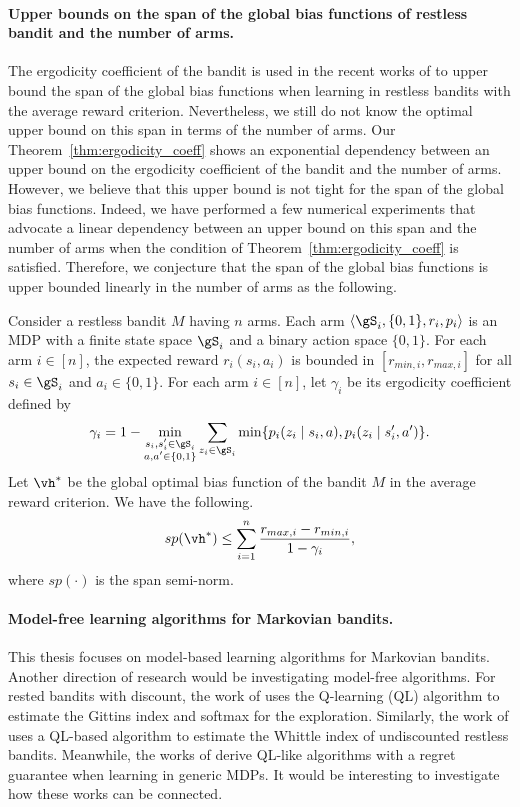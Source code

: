 \paragraph{Upper bounds on the span of the global bias functions of restless bandit and the number of arms.}
The ergodicity coefficient of the bandit is used in the recent works of \cite{akbarzadeh2022learning} to upper bound the span of the global bias functions when learning in restless bandits with the average reward criterion.
Nevertheless, we still do not know the optimal upper bound on this span in terms of the number of arms. 
Our Theorem~\ref{thm:ergodicity_coeff} shows an exponential dependency between an upper bound on the ergodicity coefficient of the bandit and the number of arms.
However, we believe that this upper bound is not tight for the span of the global bias functions.
Indeed, we have performed a few numerical experiments that advocate a linear dependency between an upper bound on this span and the number of arms when the condition of Theorem~\ref{thm:ergodicity_coeff} is satisfied.
Therefore, we conjecture that the span of the global bias functions is upper bounded linearly in the number of arms as the following.
\begin{conj}
    \label{conj:span}
    Consider a restless bandit $M$ having $n$ arms.
    Each arm $\langle\gS_i,\{0,1\},r_i,p_i\rangle$ is an MDP with a finite state space $\gS_i$ and a binary action space $\{0,1\}$.
    For each arm $i\in[n]$, the expected reward $r_i(s_i,a_i)$ is bounded in $[r_{min,i},r_{max,i}]$ for all $s_i\in\gS_i$ and $a_i\in\{0,1\}$.
    For each arm $i\in[n]$, let $\gamma_i$ be its ergodicity coefficient defined by
    \begin{align*}
        \gamma_i = 1-\min_{\substack{s_i,s'_i\in\gS_i \\a,a'\in\{0,1\}}} \sum_{z_i\in\gS_i} \min\{p_i(z_i \mid s_i, a), p_i(z_i \mid s'_i, a')\}.
    \end{align*}
    Let $\vh^*$ be the global optimal bias function of the bandit $M$ in the average reward criterion.
    We have the following.
    \begin{align*}
        sp(\vh^*) \le \sum_{i=1}^n\frac{r_{max,i}-r_{min,i}}{1-\gamma_i},
    \end{align*}
    where $sp(\cdot)$ is the span semi-norm.
\end{conj}

\paragraph{Model-free learning algorithms for Markovian bandits.}
This thesis focuses on model-based learning algorithms for Markovian bandits. 
Another direction of research would be investigating model-free algorithms.
For rested bandits with discount, the work of \cite{duff1995q} uses the Q-learning (QL) algorithm to estimate the Gittins index and softmax for the exploration.
Similarly, the work of \cite{avrachenkov2022whittle} uses a QL-based algorithm to estimate the Whittle index of undiscounted restless bandits.
Meanwhile, the works of \cite{jin2018q, wei2020model} derive QL-like algorithms with a regret guarantee when learning in generic MDPs.
It would be interesting to investigate how these works can be connected.

